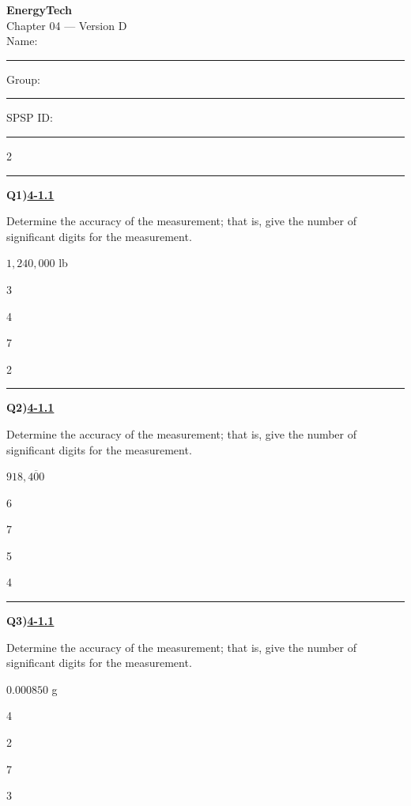 \documentclass[11pt]{article}
\newenvironment{Qbox}[2]{%
  \par\medskip\noindent\begin{minipage}{\linewidth}%
  \hrule\medskip%
  \textbf{Q#1)}\hfill\textbf{\underline{#2}}\par\smallskip%
}{\par\end{minipage}\par\medskip}
\begin{document}
\begin{center}
  {\LARGE\bfseries EnergyTech}\\[2pt]
  {\Large Chapter 04 --- Version D}\\[6pt]
  Name: \rule{4.5cm}{0.4pt}\quad Group: \rule{3cm}{0.4pt}\quad SPSP ID: \rule{3.5cm}{0.4pt}
\end{center}

\begin{multicols}{2}
\raggedcolumns
\begin{Qbox}{1}{4-1.1}
Determine the accuracy of the measurement; that is, give the number of significant digits for the measurement.\par\medskip $1{,}240{,}000$ lb
\begin{choices}
  \item 3
  \item 4
  \item 7
  \item 2
\end{choices}
\end{Qbox}

\begin{Qbox}{2}{4-1.1}
Determine the accuracy of the measurement; that is, give the number of significant digits for the measurement.\par\medskip $918{,}4\overline{0}0$
\begin{choices}
  \item 6
  \item 7
  \item 5
  \item 4
\end{choices}
\end{Qbox}

\begin{Qbox}{3}{4-1.1}
Determine the accuracy of the measurement; that is, give the number of significant digits for the measurement.\par\medskip $0.000850$ g
\begin{choices}
  \item 4
  \item 2
  \item 7
  \item 3
\end{choices}
\end{Qbox}


\end{multicols}
\end{document}
